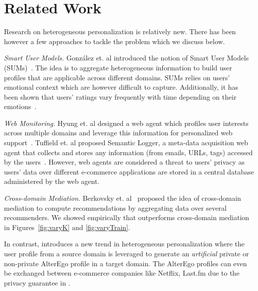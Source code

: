 \vspace{-2mm}
\section{Related Work}
\label{RelWorks}

Research on heterogeneous personalization is relatively new. There has been however a few approaches to tackle the problem which we discuss below.


{\it Smart User Models.} Gonz{\'a}lez et. al introduced the notion of Smart User Models (SUMs)~\cite{gonzalez2005multi}. The idea is to aggregate heterogeneous information to build user profiles that are applicable across different domains. SUMs relies on users' emotional context which are however difficult to capture. Additionally, it has been shown that users' ratings vary frequently with time depending on their emotions~\cite{amatriain2009like}.

{\it Web Monitoring.} 
Hyung et. al designed a web agent which profiles user interests across multiple domains and leverage this information for personalized web support~\cite{kook2005profiling}. Tuffield et. al proposed Semantic Logger, a meta-data acquisition web agent that collects and stores any information (from emails, URLs, tags) accessed by the users~\cite{tuffield2006semantic}. However, web agents are considered a threat to users' privacy as users' data over different e-commerce applications are stored in a central database administered by the web agent.

{\it Cross-domain Mediation.} Berkovsky et. al~\cite{berkovsky2007cross} proposed the idea of cross-domain mediation to compute recommendations by aggregating data over several recommenders. We showed empirically that \crossrec  outperforms cross-domain mediation in Figures~\ref{fig:varyK} and \ref{fig:varyTrain}.

In contrast, \crossrec introduces a new trend in heterogeneous personalization where the user profile from a source domain is leveraged to generate an \emph{artificial} private or non-private AlterEgo profile in a target domain. The AlterEgo profiles can even be exchanged between e-commerce companies like Netflix, Last.fm due to the privacy guarantee in \crossrec.


